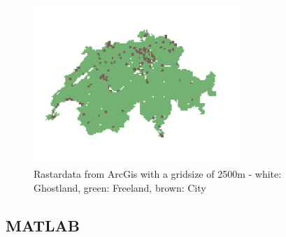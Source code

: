 \documentclass[11pt]{scrartcl}
\begin{document}
\begin{figure}[H]
	\centering
	\includegraphics[width=0.7\textwidth]{figures/map_2500_cities}
	\caption{Rastardata from ArcGis with a gridsize of 2500m - white: Ghostland, green: Freeland, brown: City}
	\label{fig:map_cities}
\end{figure}


\subsection{MATLAB}
\end{document}
